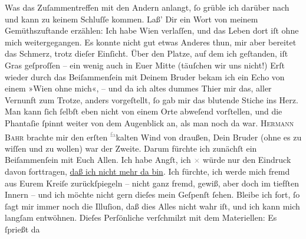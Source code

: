 \begin{ledgroupsized}[t]{13cm}
           \pstart
           Was das Zuſammentreffen mit den Andern anlangt, ſo grüble ich darüber nach und kann
               zu keinem Schluſſe kommen. Laß’ Dir ein Wort von meinem Gemüthszuftande erzählen: Ich
               habe Wien verlaſſen, und das Leben dort iſt ohne
               mich weitergegangen. Es konnte nicht gut \strikeout{\textcolor{gray}{e}} etwas Anderes {\pb}thun, mir aber bereitet das
               Schmerz, trotz dieſer Einſicht. Über den Platze, auf dem ich geſtanden, iſt Gras
               geſproſſen – ein wenig auch in Euer Mitte (täuſchen wir uns nicht!) Erſt wieder durch
               das Beiſammenſein mit Deinem Bruder bekam ich ein Echo von einem »Wien
               ohne mich«, – und da ich altes dummes Thier mir das, aller Vernunft zum Trotze,
               anders vorgeſtellt, ſo  gab mir das blutende Stiche ins Herz. Man kann {\pb}ſich ſelbſt eben nicht von einem Orte abweſend
               vorſtellen, und die Phantaſie ſpinnt weiter von dem Augenblick an, als man noch da
               war. \textsc{Hermann Bahr} brachte mir den erſten \substVorne{}\textsuperscript{\textcolor{gray}{fa}}\substDazwischen{}ka\substHinten{}lten Wind von draußen, Dein Bruder (ohne es zu wiſſen und zu wollen) war der Zweite.
               Darum fürchte ich zunächſt ein Beiſammenſein mit Euch Allen. Ich habe Angſt, ich \textcolor{gray}{×} würde nur den Eindruck davon
               forttragen, \uline{daß ich nicht mehr da bin}. Ich fürchte,
               ich werde mich fremd aus Eurem Kreiſe zurückſpiegeln – nicht ganz fremd, gewiß, {\pb}aber doch im tiefſten Innern – und ich möchte nicht
               gern \introOben{}dieſes\introOben{} mein Geſpenſt ſehen. Bleibe ich fort, ſo ſagt
               mir immer noch die Illuſion, daß dies Alles nicht wahr iſt, und ich kann mich langſam
                   entwöhnen. Dieſes Perſönliche verſchmilzt mit dem Materiellen: Es ſprießt da

\end{ledgroupsized}
